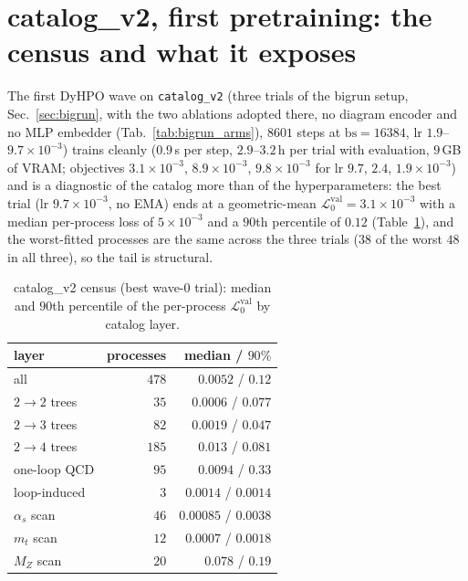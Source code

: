 \documentclass[11pt]{article}
\newcommand{\vlnr}{\mathcal{L}^{\mathrm{val}}_{0}}   %
\newcommand{\code}[1]{\texttt{#1}}
\begin{document}
\section{catalog\_v2, first pretraining: the census and what it exposes}\label{sec:catv2-census}

The first DyHPO wave on \code{catalog\_v2} (three trials of the bigrun setup, Sec.~\ref{sec:bigrun},
with the two ablations adopted there, no diagram encoder and no MLP embedder
(Tab.~\ref{tab:bigrun_arms}), $8601$ steps at $\mathrm{bs}=16384$, lr $1.9$--$9.7\times10^{-3}$)
trains cleanly ($0.9$\,s per step, $2.9$--$3.2$\,h per trial with evaluation, $9$\,GB of VRAM;
objectives $3.1\times10^{-3}$, $8.9\times10^{-3}$, $9.8\times10^{-3}$ for lr $9.7$, $2.4$,
$1.9\times10^{-3}$) and is a diagnostic
of the catalog more than of the hyperparameters: the best trial (lr $9.7\times10^{-3}$, no EMA)
ends at a geometric-mean $\vlnr=3.1\times10^{-3}$ with a median per-process loss of
$5\times10^{-3}$ and a $90$th percentile of $0.12$ (Table~\ref{tab:catv2_census}), and the
worst-fitted processes are the same across the three trials ($38$ of the worst $48$ in all
three), so the tail is structural.

\begin{table}[H]
\centering
\caption{catalog\_v2 census (best wave-0 trial): median and $90$th percentile of the
per-process $\vlnr$ by catalog layer.}
\label{tab:catv2_census}
\begin{tabular}{@{}lrr@{}}
\toprule
layer & processes & median / $90\%$ \\
\midrule
all & $478$ & $0.0052$ / $0.12$ \\
$2\to2$ trees & $35$ & $0.0006$ / $0.077$ \\
$2\to3$ trees & $82$ & $0.0019$ / $0.047$ \\
$2\to4$ trees & $185$ & $0.013$ / $0.081$ \\
one-loop QCD & $95$ & $0.0094$ / $0.33$ \\
loop-induced & $3$ & $0.0014$ / $0.0014$ \\
$\alpha_s$ scan & $46$ & $0.00085$ / $0.0038$ \\
$m_t$ scan & $12$ & $0.0007$ / $0.0018$ \\
$M_Z$ scan & $20$ & $0.078$ / $0.19$ \\
\bottomrule
\end{tabular}
\end{table}
\end{document}
